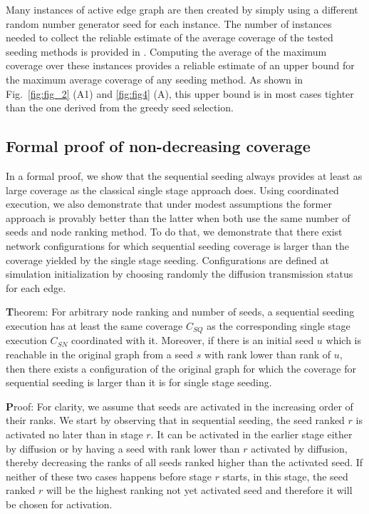 \documentclass[11pt]{article} %
\begin{document}
Many instances of active edge graph are then created by simply using a different random number generator seed for each instance. The number of instances needed to collect the reliable estimate of the average coverage of the tested seeding methods is provided in \cite{kempe2015}. Computing the average of the maximum coverage over these instances provides a reliable estimate of an upper bound for the maximum average coverage of any seeding method. As shown in Fig.~\ref{fig:fig_2} (A1) and \ref{fig:fig4} (A), this upper bound is in most cases tighter than the one derived from the greedy seed selection. 

\subsection*{Formal proof of non-decreasing coverage}
In a formal proof, we show that the sequential seeding always provides at least as large coverage as the classical single stage approach does. Using coordinated execution, we also demonstrate that under modest assumptions the former approach is provably better than the latter when both use the same number of seeds and node ranking method. To do that, we demonstrate that there exist network configurations for which sequential seeding coverage is larger than the coverage yielded by the single stage seeding. Configurations are defined at simulation initialization by choosing  randomly the diffusion transmission status for each edge.

{\textbf Theorem:} For arbitrary node ranking and number of seeds, a sequential seeding execution has at least the same coverage $C_{SQ}$ as the corresponding single stage execution $C_{SN}$ coordinated with it. Moreover, if there is an initial seed $u$ which is reachable in the original graph from a seed $s$ with rank lower than rank of $u$, then there exists a configuration of the original graph for which the coverage for sequential seeding is larger than it is for single stage seeding.

{\textbf Proof:} For clarity, we assume that seeds are activated in the increasing order of their ranks. We start by observing that in sequential seeding, the seed ranked $r$ is activated no later than in stage $r$. It can be activated in the earlier stage either by diffusion or by having a seed with rank lower than $r$ activated by diffusion, thereby decreasing the ranks of all seeds ranked higher than the activated seed. If neither of these two cases happens before stage $r$ starts, in this stage, the seed ranked $r$ will be the highest ranking not yet activated seed and therefore it will be chosen for activation.
\end{document}
